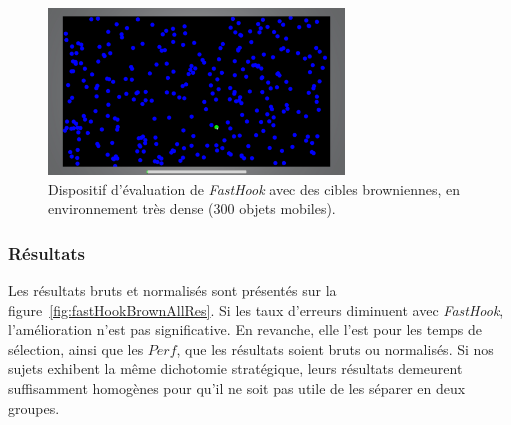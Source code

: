 	

	
	\begin{figure}[htbp]
		\centering
		\includegraphics[width=0.7\textwidth]{figures/ch5/pseudohaptics_brown}
		\caption[\emph{FastHook} avec cibles browniennes]{Dispositif d'évaluation de \emph{FastHook} avec des cibles browniennes, en environnement très dense (300 objets mobiles).}
		\label{fig:pseudohaptics_brown}
	\end{figure}

	
	\subsubsection{Résultats}
	Les résultats bruts et normalisés sont présentés sur la figure~\ref{fig:fastHookBrownAllRes}. Si les taux d'erreurs diminuent avec \emph{FastHook}, l'amélioration n'est pas significative. En revanche, elle l'est pour les temps de sélection, ainsi que les $Perf$, que les résultats soient bruts ou normalisés. Si nos sujets exhibent la même dichotomie stratégique, leurs résultats demeurent suffisamment homogènes pour qu'il ne soit pas utile de les séparer en deux groupes.
	
